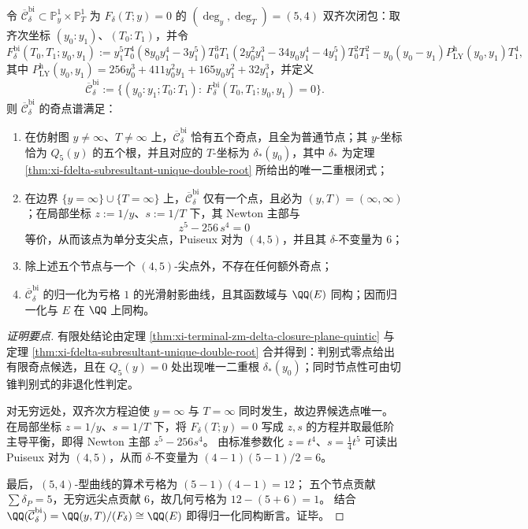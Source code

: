 \begin{theorem}\label{thm:xi-terminal-zm-delta-bihomogeneous-closure-singularity-spectrum}
令 \(\overline{\mathcal C}_\delta^{\mathrm{bi}}\subset \mathbb P^1_y\times \mathbb P^1_T\) 为 \(F_\delta(T;y)=0\) 的 \((\deg_y,\deg_T)=(5,4)\) 双齐次闭包：取齐次坐标 \((y_0:y_1)\)、\((T_0:T_1)\)，并令
\[
F_\delta^{\mathrm{bi}}(T_0,T_1;y_0,y_1)
:=
y_1^5T_0^4
(8y_0y_1^4-3y_1^5)T_0^3T_1
(2y_0^2y_1^3-34y_0y_1^4-4y_1^5)T_0^2T_1^2
-y_0(y_0-y_1)P_{\mathrm{LY}}^{\mathrm{h}}(y_0,y_1)T_1^4,
\]
其中 \(P_{\mathrm{LY}}^{\mathrm{h}}(y_0,y_1)=256y_0^3+411y_0^2y_1+165y_0y_1^2+32y_1^3\)，并定义
\[
\overline{\mathcal C}_\delta^{\mathrm{bi}}:=\{(y_0:y_1;T_0:T_1):\ F_\delta^{\mathrm{bi}}(T_0,T_1;y_0,y_1)=0\}.
\]
则 \(\overline{\mathcal C}_\delta^{\mathrm{bi}}\) 的奇点谱满足：
\begin{enumerate}
  \item 在仿射图 \(y\neq\infty\)、\(T\neq\infty\) 上，\(\overline{\mathcal C}_\delta^{\mathrm{bi}}\) 恰有五个奇点，且全为普通节点；其 \(y\)-坐标恰为 \(Q_5(y)\) 的五个根，并且对应的 \(T\)-坐标为 \(\delta_\ast(y_0)\)，其中 \(\delta_\ast\) 为定理 \ref{thm:xi-fdelta-subresultant-unique-double-root} 所给出的唯一二重根闭式；
  \item 在边界 \(\{y=\infty\}\cup\{T=\infty\}\) 上，\(\overline{\mathcal C}_\delta^{\mathrm{bi}}\) 仅有一个点，且必为 \((y,T)=(\infty,\infty)\)；在局部坐标 \(z:=1/y\)、\(s:=1/T\) 下，其 Newton 主部与
  \[
  z^{5}-256\,s^{4}=0
  \]
  等价，从而该点为单分支尖点，Puiseux 对为 \((4,5)\)，并且其 \(\delta\)-不变量为 \(6\)；
  \item 除上述五个节点与一个 \((4,5)\)-尖点外，不存在任何额外奇点；
  \item \(\overline{\mathcal C}_\delta^{\mathrm{bi}}\) 的归一化为亏格 \(1\) 的光滑射影曲线，且其函数域与 \(\QQ(E)\) 同构；因而归一化与 \(E\) 在 \(\QQ\) 上同构。
\end{enumerate}
\end{theorem}

\begin{proof}[证明要点]
有限处结论由定理 \ref{thm:xi-terminal-zm-delta-closure-plane-quintic} 与定理 \ref{thm:xi-fdelta-subresultant-unique-double-root} 合并得到：判别式零点给出有限奇点候选，且在 \(Q_5(y)=0\) 处出现唯一二重根 \(\delta_\ast(y_0)\)；同时节点性可由切锥判别式的非退化性判定。

对无穷远处，双齐次方程迫使 \(y=\infty\) 与 \(T=\infty\) 同时发生，故边界候选点唯一。
在局部坐标 \(z=1/y\)、\(s=1/T\) 下，将 \(F_\delta(T;y)=0\) 写成 \(z,s\) 的方程并取最低阶主导平衡，即得 Newton 主部 \(z^5-256s^4\)。
由标准参数化 \(z=t^4\)、\(s=\tfrac{1}{4}t^5\) 可读出 Puiseux 对为 \((4,5)\)，从而 \(\delta\)-不变量为 \((4-1)(5-1)/2=6\)。

最后，\((5,4)\)-型曲线的算术亏格为 \((5-1)(4-1)=12\)；
五个节点贡献 \(\sum\delta_P=5\)，无穷远尖点贡献 \(6\)，故几何亏格为 \(12-(5+6)=1\)。
结合 \(\QQ(\overline{\mathcal C}_\delta^{\mathrm{bi}})=\QQ(y,T)/(F_\delta)\cong \QQ(E)\) 即得归一化同构断言。证毕。
\end{proof}

